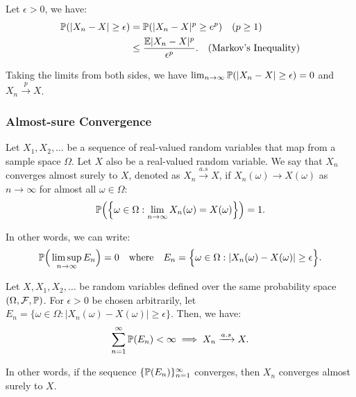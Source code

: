 \begin{proof*}
    Let $\epsilon>0$, we have:
    \begin{align*}
        \mathbb{P}(|X_n - X| \ge \epsilon) &= \mathbb{P}(|X_n - X|^p \ge e^p) \quad (p\ge 1) \\
            &\le \frac{\mathbb{E}|X_n - X|^p}{\epsilon^p}. \quad (\text{Markov's Inequality})
    \end{align*}

    \noindent Taking the limits from both sides, we have $\lim_{n\to\infty}\mathbb{P}(|X_n-X|\ge \epsilon) = 0$ and $X_n\xrightarrow{p}X$.
\end{proof*}

\subsubsection{Almost-sure Convergence}
\begin{definition}
    Let $X_1, X_2, \dots$ be a sequence of real-valued random variables that map from a sample space $\Omega$. Let $X$ also be a real-valued random variable. We say that $X_n$ converges almost surely to $X$, denoted as $X_n\xrightarrow{a.s}X$, if $X_n(\omega) \to X(\omega)$ as $n\to\infty$ for almost all $\omega\in\Omega$:
    \begin{equation}
        \mathbb{P}\Big( \Big\{ \omega\in\Omega:\lim_{n\to\infty} X_n(\omega) = X(\omega) \Big\} \Big) = 1. 
    \end{equation} 

    \noindent In other words, we can write:
    \begin{equation}
        \mathbb{P}\Big( 
            \limsup_{n\to\infty} E_n
         \Big) = 0 \quad \text{where} \quad E_n = \Big\{ 
            \omega\in\Omega: |X_n(\omega) - X(\omega)| \ge \epsilon
         \Big\}.
    \end{equation} 
\end{definition}

\begin{remark}
    Let $X, X_1, X_2, \dots$ be random variables defined over the same probability space $(\Omega, \mathcal{F}, \mathbb{P})$. For $\epsilon>0$ be chosen arbitrarily, let $E_n = \{ \omega\in\Omega: |X_n(\omega) - X(\omega)| \ge \epsilon \}$. Then, we have:
    \begin{equation}
        \sum_{n=1}^\infty \mathbb{P}(E_n) < \infty \implies X_n\xrightarrow{a.s} X.
    \end{equation}

    \noindent In other words, if the sequence $\{\mathbb{P}(E_n)\}_{n=1}^\infty$ converges, then $X_n$ converges almost surely to $X$.
\end{remark}

